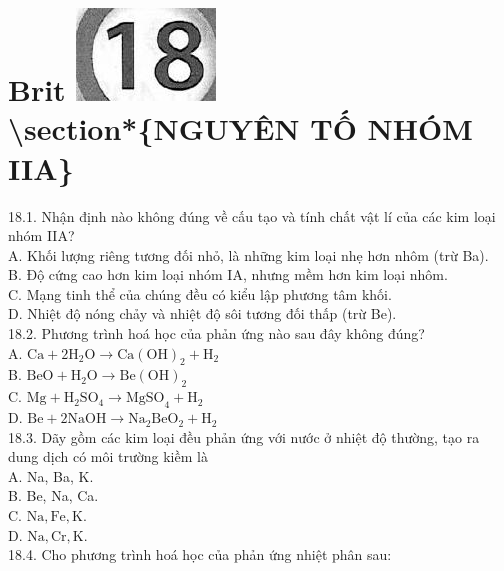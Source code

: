 \documentclass[10pt]{article}
\begin{document}
\section*{Brit \includegraphics[max width=\textwidth]{2025_10_23_de6f5713836e4e91b3c8g-108} \\
 \textbackslash section*\{NGUYÊN TỐ NHÓM IIA\}}
18.1. Nhận định nào không đúng về cấu tạo và tính chất vật lí của các kim loại nhóm IIA?\\
A. Khối lượng riêng tương đối nhỏ, là những kim loại nhẹ hơn nhôm (trừ Ba).\\
B. Độ cứng cao hơn kim loại nhóm IA, nhưng mềm hơn kim loại nhôm.\\
C. Mạng tinh thể của chúng đều có kiểu lập phương tâm khối.\\
D. Nhiệt độ nóng chảy và nhiệt độ sôi tương đối thấp (trừ Be).\\
18.2. Phương trình hoá học của phản ứng nào sau đây không đúng?\\
A. $\mathrm{Ca}+2 \mathrm{H}_{2} \mathrm{O} \rightarrow \mathrm{Ca}(\mathrm{OH})_{2}+\mathrm{H}_{2}$\\
B. $\mathrm{BeO}+\mathrm{H}_{2} \mathrm{O} \rightarrow \mathrm{Be}(\mathrm{OH})_{2}$\\
C. $\mathrm{Mg}+\mathrm{H}_{2} \mathrm{SO}_{4} \rightarrow \mathrm{MgSO}_{4}+\mathrm{H}_{2}$\\
D. $\mathrm{Be}+2 \mathrm{NaOH} \rightarrow \mathrm{Na}_{2} \mathrm{BeO}_{2}+\mathrm{H}_{2}$\\
18.3. Dãy gồm các kim loại đều phản ứng với nước ở nhiệt độ thường, tạo ra dung dịch có môi trường kiềm là\\
A. Na, Ba, K.\\
B. Be, Na, Ca.\\
C. $\mathrm{Na}, \mathrm{Fe}, \mathrm{K}$.\\
D. $\mathrm{Na}, \mathrm{Cr}, \mathrm{K}$.\\
18.4. Cho phương trình hoá học của phản ứng nhiệt phân sau:
\end{document}

